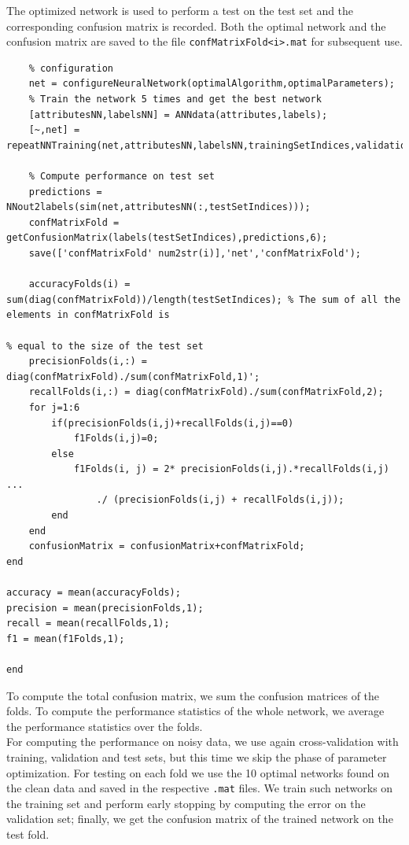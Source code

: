 \documentclass{article}
\begin{document}
The optimized network is used to perform a test on the test set and the corresponding confusion matrix is recorded. Both the optimal network and the confusion matrix are saved to the file \verb$confMatrixFold<i>.mat$ for subsequent use.
\begin{lstlisting}[firstnumber=57,breaklines=true]
    % Configure the best training algorithm with the optimal parameter
    % configuration
    net = configureNeuralNetwork(optimalAlgorithm,optimalParameters);
    % Train the network 5 times and get the best network
    [attributesNN,labelsNN] = ANNdata(attributes,labels);
    [~,net] = repeatNNTraining(net,attributesNN,labelsNN,trainingSetIndices,validationSetIndices);
    
    % Compute performance on test set
    predictions = NNout2labels(sim(net,attributesNN(:,testSetIndices)));
    confMatrixFold = getConfusionMatrix(labels(testSetIndices),predictions,6);
    save(['confMatrixFold' num2str(i)],'net','confMatrixFold');
    
    accuracyFolds(i) = sum(diag(confMatrixFold))/length(testSetIndices); % The sum of all the elements in confMatrixFold is
                                                                         % equal to the size of the test set
    precisionFolds(i,:) = diag(confMatrixFold)./sum(confMatrixFold,1)';
    recallFolds(i,:) = diag(confMatrixFold)./sum(confMatrixFold,2);
    for j=1:6
        if(precisionFolds(i,j)+recallFolds(i,j)==0)
            f1Folds(i,j)=0;
        else
            f1Folds(i, j) = 2* precisionFolds(i,j).*recallFolds(i,j) ...
                ./ (precisionFolds(i,j) + recallFolds(i,j));
        end
    end
    confusionMatrix = confusionMatrix+confMatrixFold;
end
    
accuracy = mean(accuracyFolds);
precision = mean(precisionFolds,1);
recall = mean(recallFolds,1);
f1 = mean(f1Folds,1); 
            
end
\end{lstlisting}
To compute the total confusion matrix, we sum the confusion matrices of the folds. To compute the performance statistics of the whole network, we average the performance statistics over the folds.\\
For computing the performance on noisy data, we use again cross-validation with training, validation and test sets, but this time we skip the phase of parameter optimization. For testing on each fold we use the 10 optimal networks found on the clean data and saved in the respective \verb$.mat$ files. We train such networks on the training set and perform early stopping by computing the error on the validation set; finally, we get the confusion matrix of the trained network on the test fold.
\end{document}
